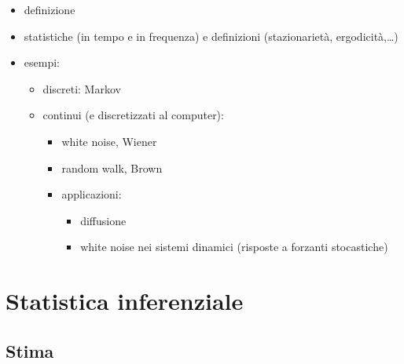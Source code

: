 \documentclass[letterpaper,10pt,italian]{jupyterBook}
\begin{document}
\sphinxAtStartPar
{}
\begin{itemize}
\item {} 
\sphinxAtStartPar
definizione

\item {} 
\sphinxAtStartPar
statistiche (in tempo e in frequenza) e definizioni (stazionarietà, ergodicità,…)

\item {} 
\sphinxAtStartPar
esempi:
\begin{itemize}
\item {} 
\sphinxAtStartPar
discreti: Markov

\item {} 
\sphinxAtStartPar
continui (e discretizzati al computer):
\begin{itemize}
\item {} 
\sphinxAtStartPar
white noise, Wiener

\item {} 
\sphinxAtStartPar
random walk, Brown

\item {} 
\sphinxAtStartPar
applicazioni:
\begin{itemize}
\item {} 
\sphinxAtStartPar
diffusione

\item {} 
\sphinxAtStartPar
white noise nei sistemi dinamici (risposte a forzanti stocastiche)

\end{itemize}

\end{itemize}

\end{itemize}

\end{itemize}

\sphinxstepscope


\chapter{Statistica inferenziale}
\label{\detokenize{ch/statistics/inference:statistica-inferenziale}}\label{\detokenize{ch/statistics/inference:statistics-hs-inference}}\label{\detokenize{ch/statistics/inference::doc}}
\sphinxstepscope


\section{Stima}
\label{\detokenize{ch/statistics/estimate:stima}}\label{\detokenize{ch/statistics/estimate:statistics-hs-inference-estimate}}\label{\detokenize{ch/statistics/estimate::doc}}
\sphinxstepscope
\end{document}
